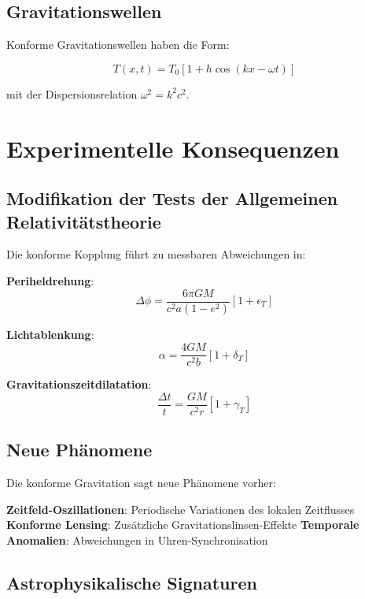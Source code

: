 \documentclass[12pt,a4paper]{report}
\begin{document}
	\subsection{Gravitationswellen}
	
	Konforme Gravitationswellen haben die Form:
	
	\begin{equation}
		T(x,t) = T_0[1 + h \cos(kx - \omega t)]
	\end{equation}
	
	mit der Dispersionsrelation $\omega^2 = k^2c^2$.
	
	\section{Experimentelle Konsequenzen}
	
	\subsection{Modifikation der Tests der Allgemeinen Relativitätstheorie}
	
	Die konforme Kopplung führt zu messbaren Abweichungen in:
	
	\textbf{Periheldrehung}:
	\begin{equation}
		\Delta\phi = \frac{6\pi GM}{c^2 a(1-e^2)} \left[1 + \epsilon_T\right]
	\end{equation}
	
	\textbf{Lichtablenkung}:
	\begin{equation}
		\alpha = \frac{4GM}{c^2 b} \left[1 + \delta_T\right]
	\end{equation}
	
	\textbf{Gravitationszeitdilatation}:
	\begin{equation}
		\frac{\Delta t}{t} = \frac{GM}{c^2 r} \left[1 + \gamma_T\right]
	\end{equation}
	
	\subsection{Neue Phänomene}
	
	Die konforme Gravitation sagt neue Phänomene vorher:
	
	\textbf{Zeitfeld-Oszillationen}: Periodische Variationen des lokalen Zeitflusses
	\textbf{Konforme Lensing}: Zusätzliche Gravitationslinsen-Effekte
	\textbf{Temporale Anomalien}: Abweichungen in Uhren-Synchronisation
	
	\subsection{Astrophysikalische Signaturen}
	
\end{document}
